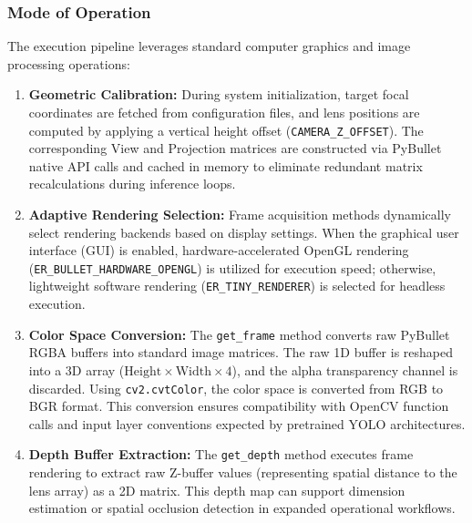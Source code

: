 \documentclass{article}
\begin{document}
\subsubsection{Mode of Operation}
The execution pipeline leverages standard computer graphics and image processing operations:

\begin{enumerate}
	\item \textbf{Geometric Calibration:} During system initialization, target focal coordinates are fetched from configuration files, and lens positions are computed by applying a vertical height offset (\texttt{CAMERA\_Z\_OFFSET}). The corresponding View and Projection matrices are constructed via PyBullet native API calls and cached in memory to eliminate redundant matrix recalculations during inference loops.
	
	\item \textbf{Adaptive Rendering Selection:} Frame acquisition methods dynamically select rendering backends based on display settings. When the graphical user interface (GUI) is enabled, hardware-accelerated OpenGL rendering (\texttt{ER\_BULLET\_HARDWARE\_OPENGL}) is utilized for execution speed; otherwise, lightweight software rendering (\texttt{ER\_TINY\_RENDERER}) is selected for headless execution.
	
	\item \textbf{Color Space Conversion:} The \texttt{get\_frame} method converts raw PyBullet RGBA buffers into standard image matrices. The raw 1D buffer is reshaped into a 3D array ($\text{Height} \times \text{Width} \times 4$), and the alpha transparency channel is discarded. Using \texttt{cv2.cvtColor}, the color space is converted from RGB to BGR format. This conversion ensures compatibility with OpenCV function calls and input layer conventions expected by pretrained YOLO architectures.
	
	\item \textbf{Depth Buffer Extraction:} The \texttt{get\_depth} method executes frame rendering to extract raw Z-buffer values (representing spatial distance to the lens array) as a 2D matrix. This depth map can support dimension estimation or spatial occlusion detection in expanded operational workflows.
\end{enumerate}
\end{document}
